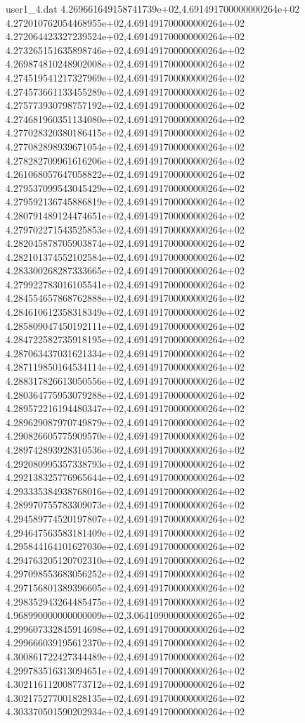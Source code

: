 \begin{filecontents}{user1_4.dat}
4.269661649158741739e+02,4.691491700000000264e+02
4.272010762054468955e+02,4.691491700000000264e+02
4.272064423327239524e+02,4.691491700000000264e+02
4.273265151635898746e+02,4.691491700000000264e+02
4.269874810248902008e+02,4.691491700000000264e+02
4.274519541217327969e+02,4.691491700000000264e+02
4.274573661133455289e+02,4.691491700000000264e+02
4.275773930798757192e+02,4.691491700000000264e+02
4.274681960351134080e+02,4.691491700000000264e+02
4.277028320380186415e+02,4.691491700000000264e+02
4.277082898939671054e+02,4.691491700000000264e+02
4.278282709961616206e+02,4.691491700000000264e+02
4.261068057647058822e+02,4.691491700000000264e+02
4.279537099543045429e+02,4.691491700000000264e+02
4.279592136745886819e+02,4.691491700000000264e+02
4.280791489124474651e+02,4.691491700000000264e+02
4.279702271543525853e+02,4.691491700000000264e+02
4.282045878705903874e+02,4.691491700000000264e+02
4.282101374552102584e+02,4.691491700000000264e+02
4.283300268287333665e+02,4.691491700000000264e+02
4.279922783016105541e+02,4.691491700000000264e+02
4.284554657868762888e+02,4.691491700000000264e+02
4.284610612358318349e+02,4.691491700000000264e+02
4.285809047450192111e+02,4.691491700000000264e+02
4.284722582735918195e+02,4.691491700000000264e+02
4.287063437031621334e+02,4.691491700000000264e+02
4.287119850164534114e+02,4.691491700000000264e+02
4.288317826613050556e+02,4.691491700000000264e+02
4.280364775953079288e+02,4.691491700000000264e+02
4.289572216194480347e+02,4.691491700000000264e+02
4.289629087970749879e+02,4.691491700000000264e+02
4.290826605775909570e+02,4.691491700000000264e+02
4.289742893928310536e+02,4.691491700000000264e+02
4.292080995357338793e+02,4.691491700000000264e+02
4.292138325776965644e+02,4.691491700000000264e+02
4.293335384938768016e+02,4.691491700000000264e+02
4.289970755783309073e+02,4.691491700000000264e+02
4.294589774520197807e+02,4.691491700000000264e+02
4.294647563583181409e+02,4.691491700000000264e+02
4.295844164101627030e+02,4.691491700000000264e+02
4.294763205120702310e+02,4.691491700000000264e+02
4.297098553683056252e+02,4.691491700000000264e+02
4.297156801389396605e+02,4.691491700000000264e+02
4.298352943264485475e+02,4.691491700000000264e+02
4.968990000000000009e+02,3.064109000000000265e+02
4.299607332845914698e+02,4.691491700000000264e+02
4.299666039195612370e+02,4.691491700000000264e+02
4.300861722427344489e+02,4.691491700000000264e+02
4.299783516313094651e+02,4.691491700000000264e+02
4.302116112008773712e+02,4.691491700000000264e+02
4.302175277001828135e+02,4.691491700000000264e+02
4.303370501590202934e+02,4.691491700000000264e+02

\end{filecontents}
